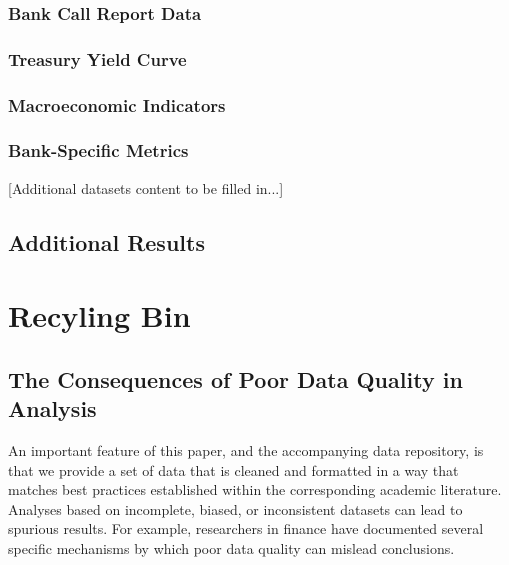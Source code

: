 \documentclass{article}
\begin{document}
\begin{appendices}

\subsubsection{Bank Call Report Data}

\subsubsection{Treasury Yield Curve}

\subsubsection{Macroeconomic Indicators}

\subsubsection{Bank-Specific Metrics}

[Additional datasets content to be filled in...]


\subsection{Additional Results}
\label{app:additional_results}

\section{Recyling Bin}


\subsection{The Consequences of Poor Data Quality in Analysis}
\label{sec:consequences_of_poor_data_quality}
An important feature of this paper, and the accompanying data repository, is that we provide a set of data that is cleaned and formatted in a way that matches best practices established within the corresponding academic literature. 
Analyses based on incomplete, biased, or inconsistent datasets can lead to spurious results. For example, researchers in finance have documented several specific mechanisms by which poor data quality can mislead conclusions.


\end{appendices}
\end{document}
